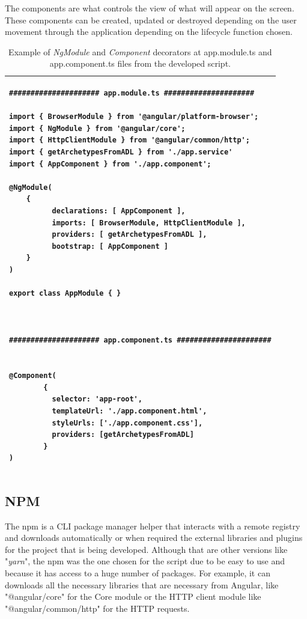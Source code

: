 \documentclass[mim_thesis.tex]{subfiles}
\begin{document}
The components are what controls the view of what will appear on the screen. These components can be created, updated or destroyed depending on the user movement through the application depending on the lifecycle function chosen.   

\begin{table}[H]
\caption{Example of \textit{NgModule} and \textit{Component} decorators at app.module.ts and app.component.ts files from the developed script.}
\label{tab:ngmoduleexample}
\centering
\begin{tabular}{l}
\toprule[2pt]
\begin{lstlisting}[language=XML]
##################### app.module.ts #####################

import { BrowserModule } from '@angular/platform-browser';
import { NgModule } from '@angular/core';
import { HttpClientModule } from '@angular/common/http';
import { getArchetypesFromADL } from './app.service'
import { AppComponent } from './app.component';

@NgModule(
	{
          declarations: [ AppComponent ],
          imports: [ BrowserModule, HttpClientModule ],
          providers: [ getArchetypesFromADL ],
          bootstrap: [ AppComponent ]
	}
)

export class AppModule { }



##################### app.component.ts ######################


@Component(
    	{
          selector: 'app-root',
          templateUrl: './app.component.html',
          styleUrls: ['./app.component.css'],
          providers: [getArchetypesFromADL]
    	}
)

\end{lstlisting}
\tabularnewline \bottomrule[2pt]
\end{tabular}
\end{table}



\subsection{NPM}
The npm is a \ac{CLI} package manager helper that interacts with a remote registry and downloads automatically or when required the external libraries and plugins for the project that is being developed. Although that are other versions like "\textit{yarn}", the npm was the one chosen for the script due to be easy to use and because it has access to a huge number of packages. For example, it can downloads all the necessary libraries that are necessary from Angular, like "@angular/core" for the Core module or the HTTP client module like "@angular/common/http" for the HTTP requests. 
\end{document}
